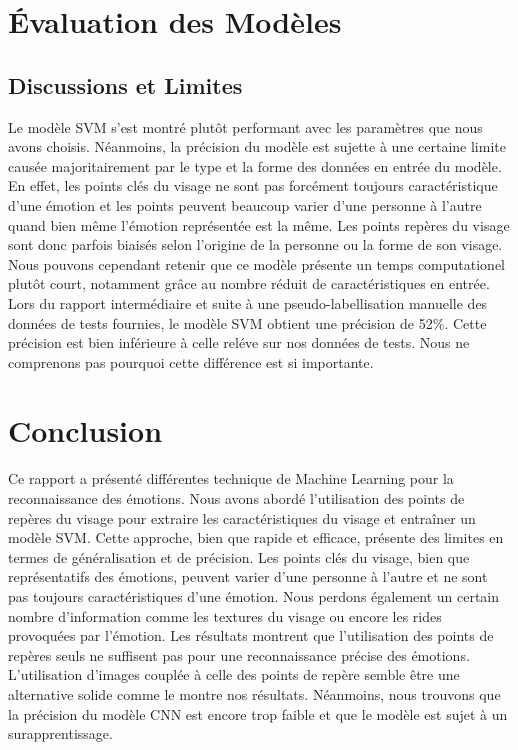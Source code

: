 \documentclass{rapport}
\begin{document}

\section{Évaluation des Modèles}
\subsection{Discussions et Limites}

Le modèle SVM s'est montré plutôt performant avec les paramètres que nous avons choisis. Néanmoins, la précision du modèle est sujette à une certaine limite causée
majoritairement par le type et la forme des données en entrée du modèle. En effet, les points clés du visage ne sont pas forcément toujours caractéristique d'une émotion
et les points peuvent beaucoup varier d'une personne à l'autre quand bien même l'émotion représentée est la même. Les points repères du visage sont donc parfois biaisés selon
l'origine de la personne ou la forme de son visage. Nous pouvons cependant retenir que ce modèle présente un temps computationel plutôt court, notamment grâce au nombre réduit
de caractéristiques en entrée.\\
Lors du rapport intermédiaire et suite à une pseudo-labellisation manuelle des données de tests fournies, le modèle SVM obtient une précision de 52\%.
Cette précision est bien inférieure à celle reléve sur nos données de tests. Nous ne comprenons pas pourquoi cette différence est si importante.

\section{Conclusion}
Ce rapport a présenté différentes technique de Machine Learning pour la reconnaissance des émotions.
Nous avons abordé l'utilisation des points de repères du visage pour extraire les caractéristiques du visage et entraîner un modèle SVM.
Cette approche, bien que rapide et efficace, présente des limites en termes de généralisation et de précision. Les points clés du visage,
bien que représentatifs des émotions, peuvent varier d'une personne à l'autre et ne sont pas toujours caractéristiques d'une émotion.
Nous perdons également un certain nombre d'information comme les textures du visage ou encore les rides provoquées par l'émotion.
Les résultats montrent que l'utilisation des points de repères seuls ne suffisent pas pour une reconnaissance précise des émotions.
L'utilisation d'images couplée à celle des points de repère semble être une alternative solide comme le montre nos résultats. Néanmoins, nous
trouvons que la précision du modèle CNN est encore trop faible et que le modèle est sujet à un surapprentissage.




\end{document}
